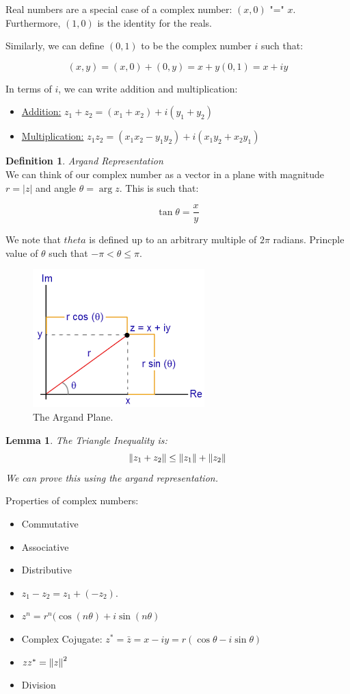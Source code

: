 \documentclass{article}
\newtheorem{lemma}{Lemma}
\theoremstyle{definition}
\newtheorem{definition}{Definition}[section]
\newcommand{\Def}[2]{
\begin{shaded*}
\begin{definition}{\textit{#1}}\\#2\end{definition}
\end{shaded*}
}
\begin{document}
Real numbers are a special case of a complex number: $(x, 0) $ "=" $x$. Furthermore, $(1,0)$ is the identity for the reals. 

Similarly, we can define $(0,1)$ to be the complex number $i$ such that:

$$(x,y) = (x, 0) + (0,y) = x + y(0,1) = x + iy$$

In terms of $i$, we can write addition and multiplication:

\begin{itemize}
	\item \underline{Addition:} $z_1 + z_2 = (x_1 + x_2) + i (y_1+y_2)$
	\item \underline{Multiplication:} $z_1 z_2 = (x_1 x_2 - y_1 y_2) + i (x_1 y_2 + x_2 y_1)$
\end{itemize}


\Def{Argand Representation}{We can think of our complex number as a vector in a plane with magnitude $r = |z|$ and angle $\theta = \arg z$. This is such that:

$$\tan \theta = \frac{x}{y}$$

We note that $theta$ is defined up to an arbitrary multiple of $2\pi$ radians. Princple value of $\theta$ such that $-\pi < \theta \leq \pi.$

\begin{figure}[H]
	\centering
	\includegraphics[width=0.5\linewidth]{Argand_plane}
	\caption{The Argand Plane.}
	\label{fig:argand}
\end{figure}
}

\begin{lemma}
	The Triangle Inequality is:
	$$\norm{z_1 + z_2} \leq \norm{z_1} + \norm{z_2}$$
	We can prove this using the argand representation. 
\end{lemma}

Properties of complex numbers:

\begin{itemize}
	\item Commutative
	\item Associative
	\item Distributive
	\item $z_1 -z_2 = z_1 + (-z_2)$.
	\item $z^n = r^n(\cos(n\theta) + i \sin(n\theta)$
	\item Complex Cojugate: $z^* = \bar{z} = x-iy = r(\cos\theta - i \sin\theta)$
	\item $z z^* = \norm{z}^2$
	\item Division 
\end{itemize}
\end{document}
